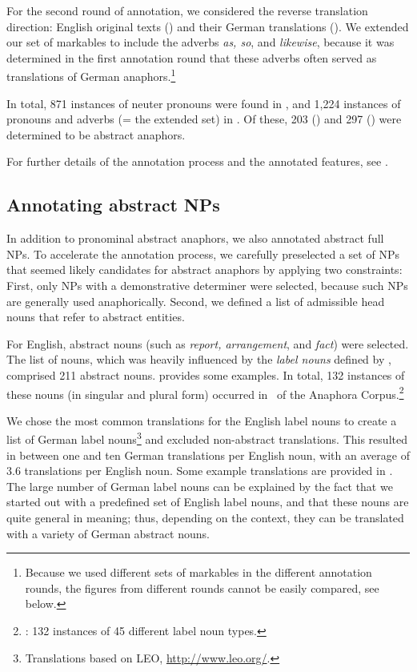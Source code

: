 \documentclass[output=paper]{LSP/langsci}
\begin{document}
For the second round of annotation, we considered the reverse translation direction: English original texts (\ENo) and their German translations (\DEt). We extended our set of markables to include the adverbs \emph{as, so}, and \emph{likewise}, because it was determined in the first annotation round that  these adverbs often served as translations of German anaphors.\footnote{Because we used different sets of markables in the different annotation rounds, the figures from different rounds cannot be easily compared, see below.}

In total, 871 instances of neuter pronouns were found in \DEo, and 1,224 instances of pronouns and adverbs (= the extended set) in \ENo. Of these, 203 (\DEo) and 297 (\ENo) were determined to be abstract anaphors. %

For further details of the annotation process and the annotated features, see \cite{dipper-etal-daarc11}.


\subsection{Annotating abstract NPs}\label{sec:corpusLabel}

In addition to pronominal abstract anaphors, we also annotated abstract full NPs. To accelerate the annotation process, we carefully preselected a set of NPs that seemed likely candidates for abstract anaphors by applying two constraints: First, only NPs with a demonstrative determiner were selected, because such NPs are generally used anaphorically. Second, we defined a list of admissible head nouns that refer to abstract entities. 

For English, abstract nouns (such as \textit{report, arrangement}, and \textit{fact}) were selected. The list of nouns, which was heavily influenced by the \emph{label nouns} defined by \cite{francis94}, comprised 211 abstract nouns.  provides some examples. In total, 132 instances of these nouns (in singular and plural form) occurred in \ENo\ of the Anaphora Corpus.\footnote{\ENo: 132 instances of 45 different label noun types.} 

We chose the most common translations for the English label nouns to create a list of German label nouns\footnote{Translations based on LEO, \url{http://www.leo.org/}.} and excluded non-abstract translations. This resulted in between one and ten  German translations per English noun, with an average of 3.6 translations per English noun. Some example translations are provided in . The large number of German label nouns can be explained by the fact that we started out with a predefined set of English label nouns, and that these nouns are quite general in meaning; thus, depending on the context, they can be translated with a variety of German abstract nouns.
\end{document}
